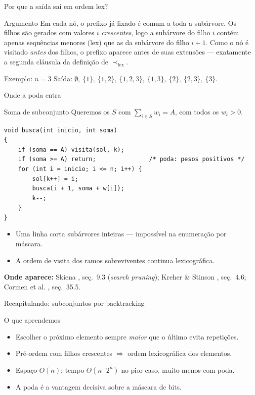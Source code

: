 \documentclass[aspectratio=169]{beamer}
\newcommand{\lex}{\prec_{\text{lex}}}
\newcommand{\fonte}[1]{%
  \par\vspace{1pt}%
  {\tiny\color{gray!30!black}\textbf{Onde aparece:} #1\par}}
\begin{document}
\begin{frame}{Por que a saída sai em ordem lex?}
  \begin{block}{Argumento}
    Em cada nó, o prefixo já fixado é comum a toda a subárvore. Os filhos são
    gerados com valores $i$ \emph{crescentes}, logo a subárvore do filho $i$ contém
    apenas sequências menores (lex) que as da subárvore do filho $i+1$.
    Como o nó é visitado \emph{antes} dos filhos, o prefixo aparece antes de suas
    extensões --- exatamente a segunda cláusula da definição de $\lex$.
  \end{block}
  \begin{exampleblock}{Exemplo: $n = 3$}
    Saída: $\emptyset,\ \{1\},\ \{1,2\},\ \{1,2,3\},\ \{1,3\},\ \{2\},\ \{2,3\},\ \{3\}$.
  \end{exampleblock}
\end{frame}

\begin{frame}[fragile]{Onde a poda entra}
  \begin{block}{Soma de subconjunto}
    Queremos os $S$ com $\sum_{i \in S} w_i = A$, com todos os $w_i > 0$.
  \end{block}
\begin{lstlisting}[style=estiloCmini]
void busca(int inicio, int soma)
{
    if (soma == A) visita(sol, k);
    if (soma >= A) return;               /* poda: pesos positivos */
    for (int i = inicio; i <= n; i++) {
        sol[k++] = i;
        busca(i + 1, soma + w[i]);
        k--;
    }
}
\end{lstlisting}
  \begin{itemize}
    \item Uma linha corta subárvores inteiras --- impossível na enumeração por máscara.
    \item A ordem de visita dos ramos sobreviventes continua lexicográfica.
  \end{itemize}
  \fonte{Skiena \cite{skiena2020algorithm}, seç.~9.3 (\textit{search pruning});
    Kreher \& Stinson \cite{kreher1999combinatorial}, seç.~4.6;
    Cormen et al. \cite{cormen2012algoritmos}, seç.~35.5.}
\end{frame}

\begin{frame}{Recapitulando: subconjuntos por backtracking}
  \begin{block}{O que aprendemos}
    \begin{itemize}
      \item Escolher o próximo elemento sempre \emph{maior} que o último evita repetições.
      \item Pré-ordem com filhos crescentes $\Rightarrow$ ordem lexicográfica dos elementos.
      \item Espaço $O(n)$; tempo $\Theta(n \cdot 2^n)$ no pior caso, muito menos com poda.
      \item A poda é a vantagem decisiva sobre a máscara de bits.
    \end{itemize}
  \end{block}
\end{frame}
\end{document}
